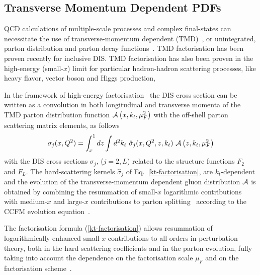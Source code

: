 \subsection{Transverse Momentum Dependent PDFs}


\def\kt{\ensuremath{k_t}}
\def\pt{\ensuremath{p_t}}


QCD calculations of multiple-scale processes  and complex final-states
can necessitate the use of transverse-momentum dependent (TMD)~\cite{Collins:2011zzd}, or 
unintegrated, parton distribution and parton decay 
functions~\cite{Aybat:2011zv,Buffing:2013eka,Buffing:2013kca,Buffing:2012sz,Mulders:2008tf,Jadach:2009gm,Hautmann:2009zzb,Hautmann:2012pf,Hautmann:2007gw}.   
TMD factorisation has been proven recently \cite{Collins:2011zzd} for inclusive DIS. TMD factorisation has also been proven in the high-energy (small-$x$) limit \cite{Catani:1990xk,Collins:1991ty,Hautmann:2010be} for 
particular hadron-hadron scattering processes, like heavy flavor, vector boson and Higgs production, 
  
In the framework of high-energy factorisation~\cite{Catani:1990xk,Catani:1990eg,Catani:1993ww} 
the DIS cross section can be written as a convolution in 
both longitudinal and transverse momenta of the TMD parton distribution function 
${\cal A}\left(x,\kt,\mu_{F}^2\right)$    
 with the off-shell parton scattering matrix elements, as follows 
\begin{equation}
 \sigma_j (x, Q^2) = \int_x^1  
d z \int d^2k_t \ 
\hat{\sigma}_j(x,Q^2,{z},k_t) \ 
 {\cal  A}\left( {z} ,\kt, \mu_{F}^2 \right) 
\label{kt-factorisation}
\end{equation}
with the DIS cross sections 
$\sigma_j$, ($j= 2 , L$) related to the  structure functions $F_2$ and $F_L$.
The hard-scattering kernels ${\hat \sigma}_j$ of Eq.~\ref{kt-factorisation},    are $k_t$-dependent and the evolution  of the 
transverse-momentum dependent gluon distribution 
${\cal A} $ is obtained by combining the resummation of small-$x$ logarithmic 
contributions \cite{Lipatov:1996ts,Fadin:1975cb,Balitsky:1978ic} with medium-$x$ and large-$x$ 
contributions to parton  splitting~\cite{Gribov:1972ri,Altarelli:1977zs,Dokshitzer:1977sg} according to the 
CCFM evolution equation~\cite{Ciafaloni:1987ur,Catani:1989sg,Marchesini:1994wr}.
  
The factorisation formula (\ref{kt-factorisation})  
allows resummation of logarithmically enhanced small-$x$ contributions  
to all orders in perturbation theory,  
both in the  hard scattering coefficients and 
in the parton evolution, fully taking into account the 
dependence on the factorisation scale $\mu_{F}$ and on the 
factorisation scheme~\cite{Catani:1994sq,Catani:1993rn}.  
 
